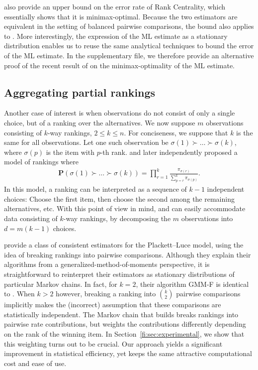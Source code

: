 \citet{negahban2012iterative} also provide an upper bound on the error rate of Rank Centrality, which essentially shows that it is minimax-optimal.
Because the two estimators are equivalent in the setting of balanced pairwise comparisons, the bound also applies to \LSR{}.
More interestingly, the expression of the ML estimate as a stationary distribution enables us to reuse the same analytical techniques to bound the error of the ML estimate.
In the supplementary file, we therefore provide an alternative proof of the recent result of \citet{hajek2014minimax} on the minimax-optimality of the ML estimate.

\subsection{Aggregating partial rankings}
\label{fi:sec:partial}

Another case of interest is when observations do not consist of only a single choice, but of a ranking over the alternatives.
We now suppose $m$ observations consisting of $k$-way rankings, $2 \le k \le n$.
For conciseness, we suppose that $k$ is the same for all observations.
Let one such observation be $\sigma(1) \succ \ldots \succ \sigma(k)$, where $\sigma(p)$ is the item with $p$-th rank.
\citet{luce1959individual} and later \citet{plackett1975analysis} independently proposed a model of rankings where
\begin{align*}
\mathbf{P}\left( \sigma(1) \succ \ldots \succ \sigma(k) \right)
  = \prod_{r = 1}^{k} \frac{\pi_{\sigma(r)}}{\sum_{p = r}^{k} \pi_{\sigma(p)}}.
\end{align*}
In this model, a ranking can be interpreted as a sequence of $k-1$ independent choices:
Choose the first item, then choose the second among the remaining alternatives, etc.
With this point of view in mind, \LSR{} and \ILSR{} can easily accommodate data consisting of $k$-way rankings, by decomposing the $m$ observations into $d = m (k - 1)$ choices.

\citet{azari2013generalized} provide a class of consistent estimators for the Plackett--Luce model, using the idea of breaking rankings into pairwise comparisons.
Although they explain their algorithms from a generalized-method-of-moments perspective, it is straightforward to reinterpret their estimators as stationary distributions of particular Markov chains.
In fact, for $k = 2$, their algorithm GMM-F is identical to \LSR{}.
When $k > 2$ however, breaking a ranking into $\binom{k}{2}$ pairwise comparisons implicitly makes the (incorrect) assumption that these comparisons are statistically independent.
The Markov chain that \LSR{} builds breaks rankings into pairwise rate contributions, but weights the contributions differently depending on the rank of the winning item.
In Section~\ref{fi:sec:experimental}, we show that this weighting turns out to be crucial.
Our approach yields a significant improvement in statistical efficiency, yet keeps the same attractive computational cost and ease of use.


